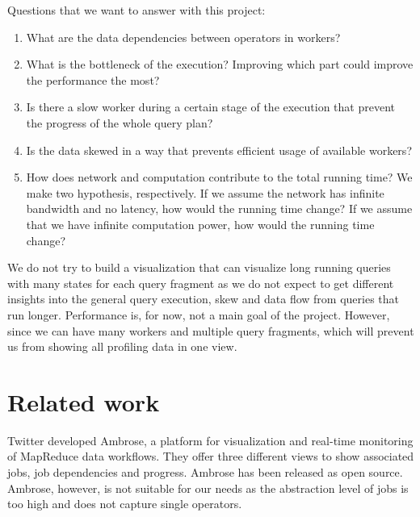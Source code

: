 \documentclass[11pt]{scrartcl}
\begin{document}
\noindent Questions that we want to answer with this project:

\begin{enumerate}
  \item What are the data dependencies between operators in workers?
  \item What is the bottleneck of the execution? Improving which part could improve the performance the most?
  \item Is there a slow worker during a certain stage of the execution that prevent the progress of the whole query plan?
  \item Is the data skewed in a way that prevents efficient usage of available workers?
  \item How does network and computation contribute to the total running time? We make two hypothesis, respectively. If we assume the network has infinite bandwidth and no latency, how would the running time change? If we assume that we have infinite computation power, how would the running time change?

\end{enumerate}

We do not try to build a visualization that can visualize long running queries with many states for each query fragment as we do not expect to get different insights into the general query execution, skew and data flow from queries that run longer. Performance is, for now, not a main goal of the project. However, since we can have many workers and multiple query fragments, which will prevent us from showing all profiling data in one view.


\section{Related work}

Twitter developed Ambrose\cite{ambrose}, a platform for visualization and real-time monitoring of MapReduce data workflows. They offer three different views to show associated jobs, job dependencies and progress. Ambrose has been released as open source. Ambrose, however, is not suitable for our needs as the abstraction level of jobs is too high and does not capture single operators.
\end{document}

